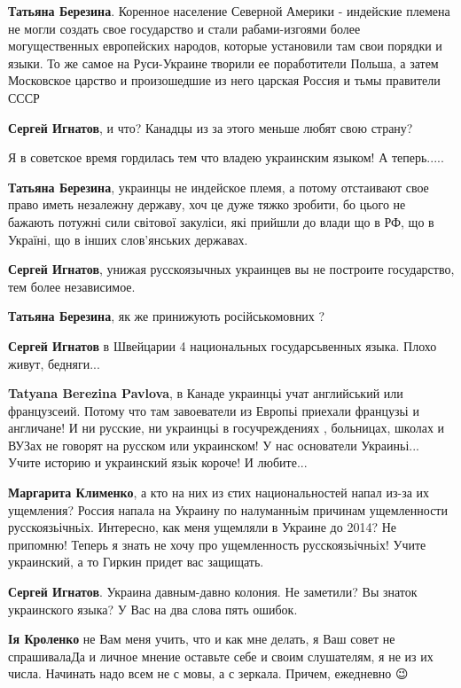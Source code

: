 \begin{itemize}
\begin{itemize}
\textbf{Татьяна Березина}. Коренное население Северной Америки - индейские
племена не могли создать свое государство и стали рабами-изгоями более
могущественных европейских народов, которые установили там свои порядки и
языки. То же самое на Руси-Украине творили ее поработители Польша, а затем
Московское царство и произошедшие из него царская Россия и тьмы правители СССР

\textbf{Сергей Игнатов}, и что? Канадцы из за этого меньше любят свою страну?

Я в советское время гордилась тем что владею украинским языком! А теперь.....

\textbf{Татьяна Березина}, украинцы не индейское племя, а потому отстаивают
свое право иметь незалежну державу, хоч це дуже тяжко зробити, бо цього не
бажають потужні сили світової закуліси, які прийшли до влади що в РФ, що в
Україні, що в інших слов'янських державах.

\textbf{Сергей Игнатов}, унижая русскоязычных украинцев вы не построите государство, тем более независимое.

\textbf{Татьяна Березина}, як же принижують російськомовних ?

\textbf{Сергей Игнатов} в Швейцарии 4 национальных государсьвенных языка. Плохо живут, бедняги...

\textbf{Tatyana Berezina Pavlova}, в Канаде украинцьі учат английський или
французсеий. Потому что там завоеватели из Европьі приехали французьі и
англичане! И ни русские, ни украинцьі в госучреждениях , больницах, школах и
ВУЗах не говорят на русском или украинском! У нас основатели Украиньі... Учите
историю и украинский язьік короче! И любите...

\textbf{Маргарита Клименко}, а кто на них из єтих национальностей напал из-за
их ущемления? Россия напала на Украину по налуманньім причинам ущемленности
русскоязьічньіх. Интересно, как меня ущемляли в Украине до 2014? Не припомню!
Теперь я знать не хочу про ущемленность русскоязьічньіх! Учите украинский, а то
Гиркин придет вас защищать.

\textbf{Сергей Игнатов}. Украина давным-давно колония. Не заметили? Вы знаток украинского языка? У Вас на два слова пять ошибок.

\textbf{Ія Кроленко} не Вам меня учить, что и как мне делать, я Ваш совет не
спрашивала\Laughey[1.0] Да и личное мнение оставьте себе и своим слушателям, я не из их
числа. Начинать надо всем не с мовы, а с зеркала. Причем, ежедневно 😉


\end{itemize}
\end{itemize}
